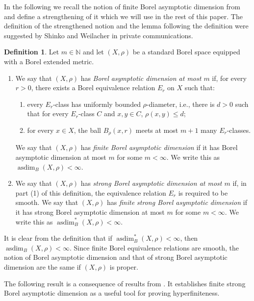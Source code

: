 \documentclass[11pt, reqno, a4paper]{amsart}
\theoremstyle{definition}
\newtheorem{definition}[theorem]{Definition}
\theoremstyle{plain}
\begin{document}
In the following we recall the notion of finite Borel asymptotic dimension from \cite{ConleyJacksonMarksSewardTuckerDrob2023} and define a strengthening of it which we will use in the rest of this paper. The definition of the strengthened notion and the lemma following the definition were suggested by Shinko and Weilacher in  private communications.

\begin{definition}\label{def:fBasd}
Let $m\in\mathbb{N}$ and let $(X,\rho)$ be a standard Borel space equipped with a Borel extended
metric. 
\begin{enumerate}
\item[(1)] We say that $(X,\rho)$ has \emph{Borel asymptotic dimension at most
$m$} if, for every $r>0$, there exists a Borel equivalence relation $E_r$
on $X$ such that:
\begin{enumerate}[label=(\roman*),leftmargin=2.7em]
\item every $E_r$-class has uniformly bounded $\rho$-diameter, i.e., there is $d>0$ such that for every $E_r$-class $C$ and $x, y\in C$, $\rho(x,y)\leq d$;

\item for every $x\in X$, the ball
$B_\rho(x,r)$
meets at most $m+1$ many $E_r$-classes.
\end{enumerate}
We say that $(X,\rho)$ has \emph{finite Borel asymptotic dimension} if it has
Borel asymptotic dimension at most $m$ for some $m<\infty$. We write this as
$\operatorname{asdim}_B(X,\rho)<\infty$. 
\item[(2)] We say that $(X,\rho)$ has \emph{strong Borel asymptotic dimension at most
$m$} if, in part (1) of this definition, the equivalence relation $E_r$ is required to be smooth. 
We say that $(X,\rho)$ has \emph{finite strong Borel asymptotic dimension} if it has
strong Borel asymptotic dimension at most $m$ for some $m<\infty$. We write this as
$\operatorname{asdim}^*_B(X,\rho)<\infty$.
\end{enumerate}
\end{definition}

It is clear from the definition that if $\operatorname{asdim}^*_B(X, \rho)<\infty$, then $\operatorname{asdim}_B(X, \rho)<\infty$. Since finite Borel equivalence relations are smooth, the notion of Borel asymptotic dimension and that of strong Borel asymptotic dimension are the same if $(X, \rho)$ is proper.

The following result is a consequence of results from \cite{ConleyJacksonMarksSewardTuckerDrob2023}. It establishes finite strong Borel asymptotic dimension as a useful tool for proving hyperfiniteness.  
\end{document}
